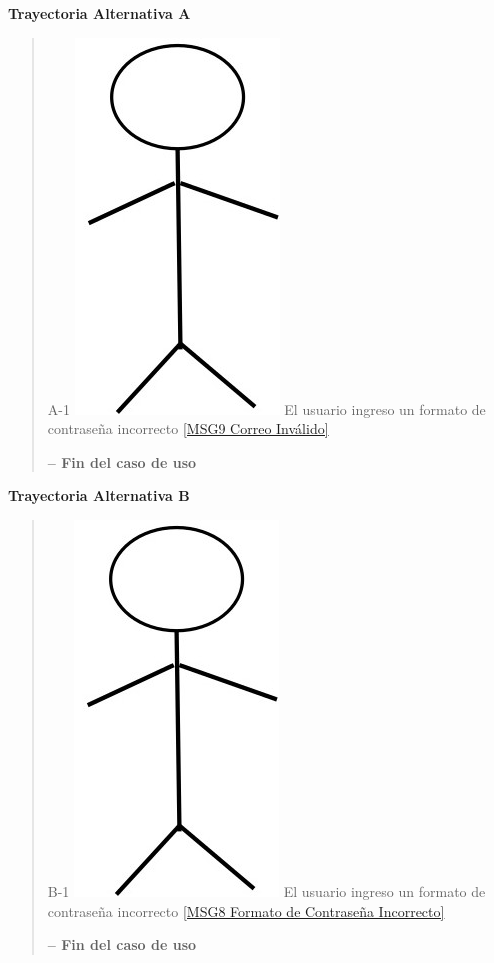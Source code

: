 \documentclass[14pt]{article}
\begin{document}
                \vspace{0.5cm}\textbf{Trayectoria Alternativa A}\label{CU-1.6 Trayectoria Alternativa A}
                    \begin{quote}
                        \item A-1  \includegraphics[height=0.02\textwidth]{Actor.jpg}
                            \label{Actor} El usuario ingreso un formato de contraseña incorrecto \ref{MSG9 Correo Inválido}
                        
                        \vspace{0.3cm}\textbf{-- Fin del caso de uso}
                    \end{quote}
                
                \vspace{0.5cm}\textbf{Trayectoria Alternativa B}\label{CU-1.6 Trayectoria Alternativa B}
                    \begin{quote}
                        \item B-1  \includegraphics[height=0.02\textwidth]{Actor.jpg}
                            \label{Actor} El usuario ingreso un formato de contraseña incorrecto \ref{MSG8 Formato de Contraseña Incorrecto}
                        
                        \vspace{0.3cm}\textbf{-- Fin del caso de uso}
                    \end{quote}
                
            \newpage 
\end{document}
